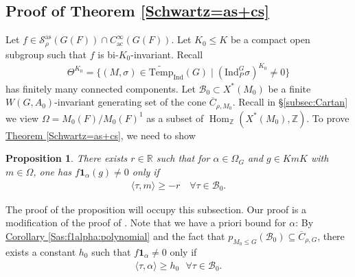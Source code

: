 \documentclass[10pt]{amsart}
\newtheorem{proposition}[theorem]{Proposition}
\theoremstyle{definition}
\numberwithin{equation}{section}
\DeclareMathOperator{\Hom}{\mathrm{Hom}}
\numberwithin{equation}{subsection}
\newcommand{\Ind}{\mathrm{Ind}}
\newcommand{\ZZ}{\mathbb{Z}}
\newcommand{\RR}{\mathbb{R}}
\newcommand{\calB}{\mathcal{B}}
\newcommand{\Temp}{\mathrm{Temp}}
\begin{document}
\subsection{Proof of Theorem \ref{Schwartz=as+cs}}\label{ssec:Supportproof}
 


Let $f\in\mathcal{S}_{\rho}^{\mathrm{as}}(G(F))\cap  C^\infty_{\mathrm{ac}}(G(F)).$ Let $K_0\le K$ be a compact open subgroup such that $f$ is bi-$K_0$-invariant. Recall 
\begin{align*}
    \Theta^{K_0} = \{(M,\sigma)\in\widetilde{\Temp}_\Ind(G)\mid (\Ind_P^G\sigma)^{K_0}\neq 0\}
\end{align*}
has finitely many connected components. Let $\mathcal{B}_0\subset X^*(M_0)$ be a finite $W(G,A_0)$-invariant generating set of the cone $\overline{C}_{\rho,M_0}$. Recall in \S\ref{subsec:Cartan} we view $\Omega=M_0(F)/M_0(F)^1$ as a subset of $\Hom_\ZZ(X^*(M_0),\ZZ)$. To prove \hyperref[Schwartz=as+cs]{Theorem \ref{Schwartz=as+cs}}, we need to show


\begin{proposition}\label{prop:key} There exists $r\in \RR$ such that for $\alpha\in\Omega_G$ and $g\in KmK$ with $m\in\Omega$, one has $f\mathbf{1}_\alpha(g)\neq 0$ only if
\begin{align*}
   \langle \tau ,m\rangle\ge -r\quad \forall\tau\in \calB_0.
\end{align*}
\end{proposition}

The proof of the proposition will occupy this subsection. Our proof is a modification of the proof of \cite[Proposition 2.1]{Heiermann:HeckePlan}. Note that we have a priori bound for $\alpha$: By \hyperref[Sas:f1alpha:polynomial]{Corollary \ref{Sas:f1alpha:polynomial}} and the fact that $p_{M_0\leq G}(\mathcal{B}_0)\subseteq \overline{C}_{\rho,G}$, there exists a constant $h_0$ such that $f\mathbf{1}_\alpha\neq 0$ only if
\begin{align}\label{support:alpha:bound}
    \langle\tau,\alpha\rangle\geq h_0\,\,\,\,\forall \tau\in\mathcal{B}_0.
\end{align}
\end{document}
